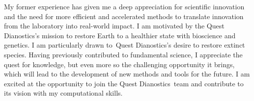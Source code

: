 \documentclass[11pt, a4paper]{awesome-cv}
\newcommand{\companyname}{Quest Dianostics}
\begin{document}
\begin{cvletter}
		
		My former experience has given me a deep appreciation for scientific innovation and the need for more efficient and accelerated methods to translate innovation from the laboratory into real-world impact.
		I am motivated by the \companyname's mission to restore Earth to a healthier state with bioscience and genetics.
		I am particularly drawn to~\companyname's desire to restore extinct species. Having previously contributed to fundamental science, I appreciate the quest for knowledge, but even more so the challenging opportunity it brings, which will lead to the development of new methods and tools for the future.
		I am excited at the opportunity to join the \companyname~team and contribute to its vision with my computational skills.
		

\end{cvletter}
\end{document}
